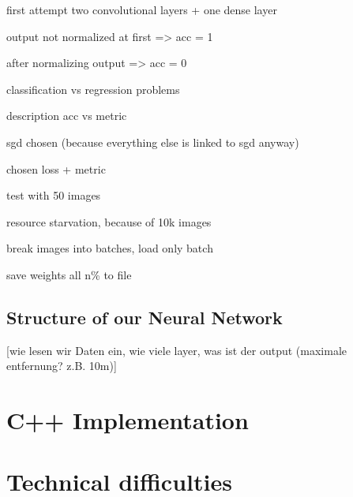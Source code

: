 first attempt two convolutional layers + one dense layer

output not normalized at first => acc = 1

after normalizing output => acc = 0

classification vs regression problems

description acc vs metric

sgd chosen (because everything else is linked to sgd anyway)

chosen loss + metric

test with 50 images

resource starvation, because of 10k images

break images into batches, load only batch

save weights all n\% to file

\subsection{Structure of our Neural Network}

[wie lesen wir Daten ein, wie viele layer, was ist der output (maximale entfernung? z.B. 10m)]

\section{C++ Implementation}

\section{Technical difficulties}

\filbreak
